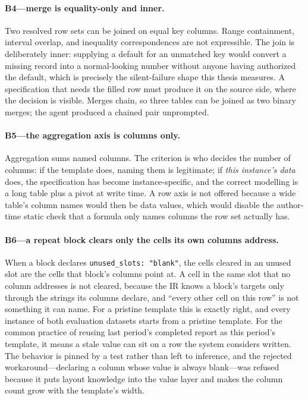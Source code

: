 \paragraph{B4---merge is equality-only and inner.}
Two resolved row sets can be joined on equal key columns. Range containment, interval
overlap, and inequality correspondences are not expressible. The join is deliberately
inner: supplying a default for an unmatched key would convert a missing record into a
normal-looking number without anyone having authorized the default, which is precisely the
silent-failure shape this thesis measures. A specification that needs the filled row must
produce it on the source side, where the decision is visible. Merges chain, so three
tables can be joined as two binary merges; the agent produced a chained pair unprompted.

\paragraph{B5---the aggregation axis is columns only.}
Aggregation sums named columns. The criterion is who decides the number of columns: if the
template does, naming them is legitimate; if \emph{this instance's data} does, the
specification has become instance-specific, and the correct modelling is a long table plus
a pivot at write time. A row axis is not offered because a wide table's column names would
then be data values, which would disable the author-time static check that a formula only
names columns the row set actually has.

\paragraph{B6---a repeat block clears only the cells its own columns address.}
When a block declares \texttt{unused\_slots: "blank"}, the cells cleared in an unused slot
are the cells that block's columns point at. A cell in the same slot that no column
addresses is not cleared, because the IR knows a block's targets only through the strings
its columns declare, and ``every other cell on this row'' is not something it can name.
For a pristine template this is exactly right, and every instance of both evaluation
datasets starts from a pristine template. For the common practice of reusing last period's
completed report as this period's template, it means a stale value can sit on a row the
system considers written. The behavior is pinned by a test rather than left to inference,
and the rejected workaround---declaring a column whose value is always blank---was refused
because it puts layout knowledge into the value layer and makes the column count grow with
the template's width.

